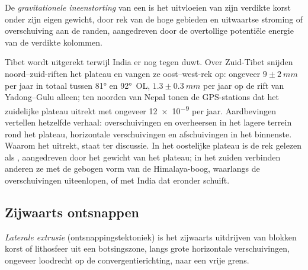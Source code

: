 \begin{definition}\label{def:b2:himalaya-andes:collapse}
De \emph{gravitationele ineenstorting} van een 
is het uitvloeien van zijn verdikte korst onder zijn eigen gewicht, door rek van de hoge
gebieden en uitwaartse stroming of overschuiving aan de randen, aangedreven door de overtollige potentiële energie van
de verdikte kolommen.
\end{definition}

Tibet wordt uitgerekt terwijl India er nog tegen duwt. Over Zuid-Tibet snijden
noord--zuid-riften het plateau en vangen ze oost--west-rek op: ongeveer $9 \pm \qty{2}{mm}$ per jaar in
totaal tussen \ang{81} en \ang{92}~OL, $1.3 \pm \qty{0.3}{mm}$ per jaar op de rift van Yadong--Gulu
alleen; ten noorden van Nepal tonen de GPS-stations dat het zuidelijke plateau uitrekt met ongeveer
\num{12e-9} per jaar. Aardbevingen vertellen hetzelfde verhaal: overschuivingen en 
overheersen in het lagere terrein rond het plateau, horizontale verschuivingen en afschuivingen in het binnenste.
Waarom het uitrekt, staat ter discussie. In het oostelijke plateau is de rek gelezen als , aangedreven door het gewicht van het plateau; in het zuiden verbinden anderen ze met de gebogen vorm
van de Himalaya-boog, waarlangs de overschuivingen uiteenlopen, of met India dat eronder schuift.

\subsection{Zijwaarts ontsnappen}

\begin{definition}\label{def:b2:himalaya-andes:extrusion}
\emph{Laterale extrusie} (ontsnappingstektoniek) is het zijwaarts uitdrijven van
blokken korst of lithosfeer uit een botsingszone, langs grote horizontale verschuivingen,
ongeveer loodrecht op de convergentierichting, naar een vrije grens.
\end{definition}

